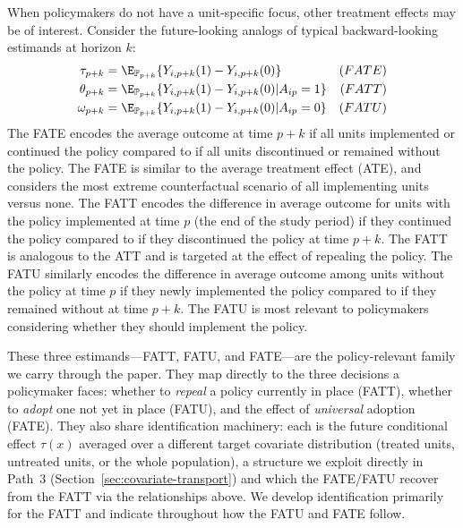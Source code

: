 \documentclass{article}
\renewcommand{\P}{\mathbb{P}}
\begin{document}
When policymakers do not have a unit-specific focus, other treatment effects may be of interest. Consider the future-looking analogs of typical backward-looking estimands at horizon $k$:
\begin{align*}
    \tau_{p+k} &= \E_{\P_{p+k}}\{Y_{i,p+k}(1) - Y_{i,p+k}(0)\} & (FATE)\\
    \theta_{p+k} &= \E_{\P_{p+k}}\{Y_{i,p+k}(1) - Y_{i,p+k}(0) | A_{ip} = 1\} & (FATT)\\
     \omega_{p+k} &= \E_{\P_{p+k}}\{Y_{i,p+k}(1) - Y_{i,p+k}(0) | A_{ip} = 0\} & (FATU)
\end{align*}
The FATE encodes the average outcome at time $p+k$ if all units implemented or continued the policy compared to if all units discontinued or remained without the policy. The FATE is similar to the average treatment effect (ATE), and considers the most extreme counterfactual scenario of all implementing units versus none. The FATT encodes the difference in average outcome for units with the policy implemented at time $p$ (the end of the study period)
if they continued the policy compared to if they discontinued the policy at time $p+k$. The FATT is analogous to the ATT and is targeted at the effect of repealing the policy. The FATU similarly encodes the difference in average outcome among units without the policy at time $p$ if they newly implemented the policy compared to if they remained without at time $p+k$. The FATU is most relevant to policymakers considering whether they should implement the policy.

These three estimands---FATT, FATU, and FATE---are the policy-relevant family we carry through the paper. They map directly to the three decisions a policymaker faces: whether to \emph{repeal} a policy currently in place (FATT), whether to \emph{adopt} one not yet in place (FATU), and the effect of \emph{universal} adoption (FATE). They also share identification machinery: each is the future conditional effect $\tau(x)$ averaged over a different target covariate distribution (treated units, untreated units, or the whole population), a structure we exploit directly in Path~3 (Section~\ref{sec:covariate-transport}) and which the FATE/FATU recover from the FATT via the relationships above. We develop identification primarily for the FATT and indicate throughout how the FATU and FATE follow.
\end{document}
